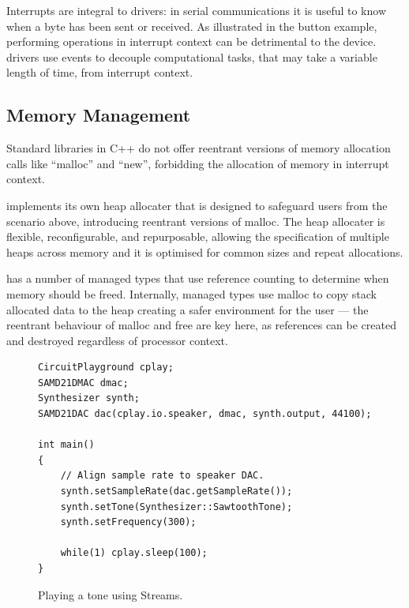 Interrupts are integral to drivers: in serial communications it is useful to know when a byte has been sent or received. As illustrated in the button example, performing operations in interrupt context can be detrimental to the device. \CO drivers use events to decouple computational tasks, that may take a variable length of time, from interrupt context.


\subsection{Memory Management}

Standard libraries in C++ do not offer reentrant versions of memory allocation calls like ``malloc'' and ``new'', forbidding the allocation of memory in interrupt context.

\CO implements its own heap allocater that is designed to safeguard users from the scenario above, introducing reentrant versions of malloc. The heap allocater is flexible, reconfigurable, and repurposable, allowing the specification of multiple heaps across memory and it is optimised for common sizes and repeat allocations.

\CO has a number of managed types that use reference counting to determine when memory should be freed. Internally, managed types use malloc to copy stack allocated data to the heap creating a safer environment for the user --- the reentrant behaviour of malloc and free are key here, as references can be created and destroyed regardless of processor context.

\begin{figure}
\begin{lstlisting}
CircuitPlayground cplay;
SAMD21DMAC dmac;
Synthesizer synth;
SAMD21DAC dac(cplay.io.speaker, dmac, synth.output, 44100);

int main()
{
    // Align sample rate to speaker DAC.
    synth.setSampleRate(dac.getSampleRate());
    synth.setTone(Synthesizer::SawtoothTone);
    synth.setFrequency(300);

    while(1) cplay.sleep(100);
}
\end{lstlisting}
\caption{\label{fig:play}Playing a tone using Streams.}
\end{figure}


